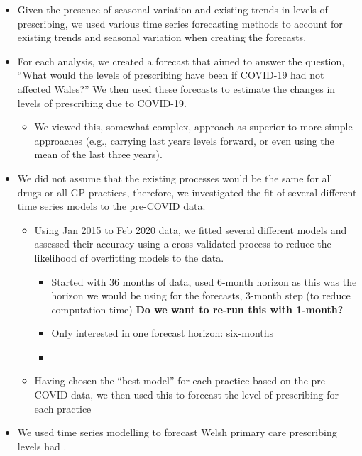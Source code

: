 \documentclass[
  english,
  man,floatsintext]{apa7}
\providecommand{\tightlist}{%
  \setlength{\itemsep}{0pt}\setlength{\parskip}{0pt}}
\begin{document}
\begin{itemize}
\item
  Given the presence of seasonal variation and existing trends in levels of prescribing, we used various time series forecasting methods to account for existing trends and seasonal variation when creating the forecasts.
\item
  For each analysis, we created a forecast that aimed to answer the question, \enquote{What would the levels of prescribing have been if COVID-19 had not affected Wales?} We then used these forecasts to estimate the changes in levels of prescribing due to COVID-19.

  \begin{itemize}
  \tightlist
  \item
    We viewed this, somewhat complex, approach as superior to more simple approaches (e.g., carrying last years levels forward, or even using the mean of the last three years).
  \end{itemize}
\item
  We did not assume that the existing processes would be the same for all drugs or all GP practices, therefore, we investigated the fit of several different time series models to the pre-COVID data.

  \begin{itemize}
  \tightlist
  \item
    Using Jan 2015 to Feb 2020 data, we fitted several different models and assessed their accuracy using a cross-validated process to reduce the likelihood of overfitting models to the data.

    \begin{itemize}
    \item
      Started with 36 months of data, used 6-month horizon as this was the horizon we would be using for the forecasts, 3-month step (to reduce computation time) \textbf{Do we want to re-run this with 1-month?}
    \item
      Only interested in one forecast horizon: six-months
    \item
    \end{itemize}
  \item
    Having chosen the \enquote{best model} for each practice based on the pre-COVID data, we then used this to forecast the level of prescribing for each practice
  \end{itemize}
\item
  We used time series modelling to forecast Welsh primary care prescribing levels had .


\end{itemize}
\end{document}
